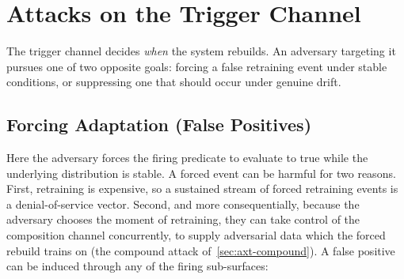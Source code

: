 \section{Attacks on the Trigger Channel}
\label{sec:axt-trigger}
The trigger channel decides \emph{when} the system rebuilds. An adversary targeting it pursues one of two opposite goals: forcing a false retraining event under stable conditions, or suppressing one that should occur under genuine drift.

\subsection{Forcing Adaptation (False Positives)}
\label{sec:axt-force}
Here the adversary forces the firing predicate to evaluate to true while the underlying distribution is stable. A forced event can be harmful for two reasons. First, retraining is expensive, so a sustained stream of forced retraining events is a denial-of-service vector. Second, and more consequentially, because the adversary chooses the moment of retraining, they can take control of the composition channel concurrently, to supply adversarial data which the forced rebuild trains on (the compound attack of~\cref{sec:axt-compound}). A false positive can be induced through any of the firing sub-surfaces:
